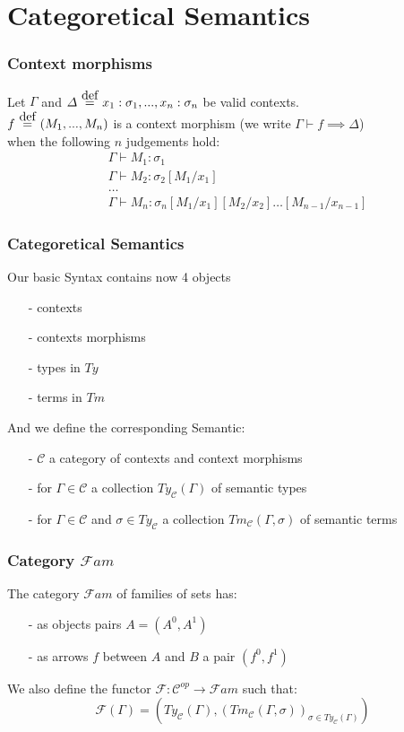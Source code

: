 \documentclass[aspectratio=169]{beamer}
\newcommand\defeq{\stackrel{\mathclap{\normalfont\mbox{def}}}{\ =\ }}
\newcommand{\Gamdash}{\Gamma\vdash}
\newcommand{\Fami}{\mathcal{F}am}
\newcommand{\cate}{\mathcal{C}}
\newcommand{\types}{Ty_{\cate}}
\newcommand{\terms}{Tm_{\cate}}
\begin{document}
    \section{Categoretical Semantics}
    \begin{frame}
        \frametitle{Context morphisms}
        Let $\Gamma$ and $\Delta \defeq x_1:\sigma_1,...,x_n:\sigma_n$ be valid contexts.\\
        $f \defeq (M_1,...,M_n)$ is a context morphism (we write $\Gamdash f \implies \Delta$)\\
        when the following $n$ judgements hold:
        \begin{align*}
            &\Gamdash M_1:\sigma_1\\
            &\Gamdash M_2:\sigma_2[M_1/x_1]\\
            &\dots\\
            &\Gamdash M_n:\sigma_n[M_1/x_1][M_2/x_2]\dots[M_{n-1}/x_{n-1}]
        \end{align*}
    \end{frame}
    \begin{frame}
        \frametitle{Categoretical Semantics}
        Our basic Syntax contains now 4 objects
        \begin{itemize}
            \item[-] contexts
            \item[-] contexts morphisms
            \item[-] types in $Ty$
            \item[-] terms in $Tm$   
        \end{itemize}
        \vspace{10pt}
        And we define the corresponding Semantic:
        \begin{itemize}
            \item[-] $\cate$ a category of contexts and context morphisms
            \item[-] for $\Gamma\in\cate$ a collection $\types(\Gamma)$ of semantic types
            \item[-] for $\Gamma\in\cate$ and $\sigma\in\types$ a collection $\terms(\Gamma,\sigma)$ of semantic terms
        \end{itemize}
        
    \end{frame}
    \begin{frame}
        \frametitle{Category $\Fami$}
        The category $\Fami$ of families of sets has:
        \begin{itemize}
            \item[-] as objects pairs $A = (A^0,A^1)$
            \item[-] as arrows $f$ between $A$ and $B$ a pair $(f^0,f^1)$
        \end{itemize}
        \vspace{15pt}
        We also define the functor $\mathcal{F}:\cate^{op}\to\Fami$ such that:
        $$\mathcal{F}(\Gamma)=(\types(\Gamma),(\terms(\Gamma,\sigma))_{\sigma\in\types(\Gamma)})$$
    \end{frame}
\end{document}
